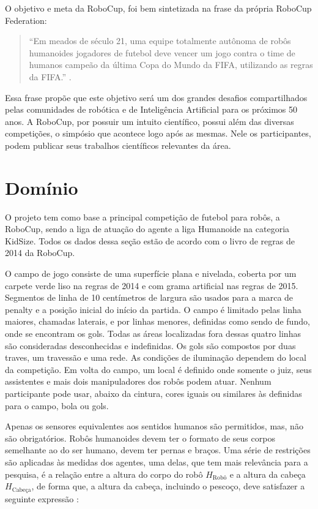 O objetivo e meta da RoboCup, foi bem sintetizada na frase da própria RoboCup Federation:
\begin{quote}
``Em meados de século 21, uma equipe totalmente autônoma de robôs humanoides jogadores de futebol deve vencer um jogo contra o time de humanos campeão da última Copa do Mundo da FIFA, utilizando as regras da FIFA.'' \cite{siteobjetivoRoboCup}. 
\end{quote}

Essa frase propõe que este objetivo será um dos grandes desafios compartilhados pelas comunidades de robótica e de Inteligência Artificial para os próximos 50 anos. A RoboCup, por possuir um intuito científico, possui além das diversas competições, o simpósio que acontece logo após as mesmas. Nele os participantes, podem publicar seus trabalhos científicos relevantes da área.

\section{Domínio}
\label{Dom}
O projeto tem como base a principal competição de futebol para robôs, a RoboCup, sendo a liga de atuação do agente a liga Humanoide na categoria KidSize. Todos os dados dessa seção estão de acordo com o livro de regras de 2014 da RoboCup. \cite{Rules}

O campo de jogo consiste de uma superfície plana e nivelada, coberta por um carpete verde liso na regras de 2014 \cite{Rules} e com grama artificial nas regras de 2015. Segmentos de linha de 10 centímetros de largura são usados para a marca de penalty e a posição inicial do início da partida. O campo é limitado pelas linha maiores, chamadas laterais, e por linhas menores, definidas como sendo de fundo, onde se encontram os gols. Todas as áreas localizadas fora dessas quatro linhas são consideradas desconhecidas e indefinidas. Os gols são compostos por duas traves, um travessão e uma rede. As condições de iluminação dependem do local da competição. Em volta do campo, um local é definido onde somente o juiz, seus assistentes e mais dois manipuladores dos robôs podem atuar. Nenhum participante pode usar, abaixo da cintura, cores iguais ou similares às definidas para o campo, bola ou gols. 

Apenas os sensores equivalentes aos sentidos humanos são permitidos, mas, não são obrigatórios. Robôs humanoides devem ter o formato de seus corpos semelhante ao do ser humano, devem ter pernas e braços. Uma série de restrições são aplicadas às medidas dos agentes, uma delas, que tem mais relevância para a pesquisa, é a relação entre a altura do corpo do robô \(H_{\text{Robô}}\) e a altura da cabeça \(H_{\text{Cabeça}}\), de forma que, a altura da cabeça, incluindo o pescoço, deve satisfazer a seguinte expressão \cite{Rules}:\hfill 

